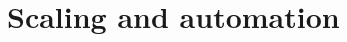 \documentclass{report}
\begin{document}
\chapter{Scaling and automation}
\label{cha:scaling-and-automation}



\end{document}

